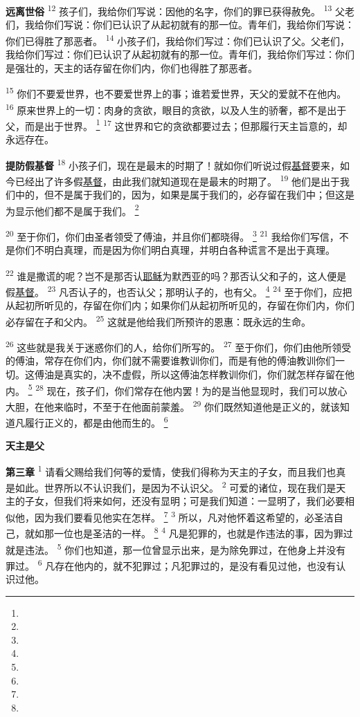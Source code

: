 \begin{multicols}{2}
\textbf{远离世俗\quad}
\textsuperscript{12}
孩子们，我给你们写说：因他的名字，你们的罪已获得赦免。
\textsuperscript{13}
父老们，我给你们写说：你们已认识了从起初就有的那一位。青年们，我给你们写说：你们已得胜了那恶者。
\textsuperscript{14}
小孩子们，我给你们写过：你们已认识了父。父老们，我给你们写过：你们已认识了从起初就有的那一位。青年们，我给你们写过：你们是强壮的，天主的话存留在你们内，你们也得胜了那恶者。

\textsuperscript{15}
你们不要爱世界，也不要爱世界上的事；谁若爱世界，天父的爱就不在他内。
\textsuperscript{16}
原来世界上的一切：肉身的贪欲，眼目的贪欲，以及人生的骄奢，都不是出于父，而是出于世界。
\footnote{}
\textsuperscript{17}
这世界和它的贪欲都要过去；但那履行天主旨意的，却永远存在。

\textbf{提防假基督\quad}
\textsuperscript{18}
小孩子们，现在是最末的时期了！就如你们听说过假\uline{基督}要来，如今已经出了许多假\uline{基督}，由此我们就知道现在是最末的时期了。
\textsuperscript{19}
他们是出于我们中的，但不是属于我们的，因为，如果是属于我们的，必存留在我们中；但这是为显示他们都不是属于我们。
\footnote{}

\textsuperscript{20}
至于你们，你们由圣者领受了傅油，并且你们都晓得。
\footnote{}
\textsuperscript{21}
我给你们写信，不是你们不明白真理，而是因为你们明白真理，并明白各种谎言不是出于真理。

\textsuperscript{22}
谁是撒谎的呢？岂不是那否认\uline{耶稣}为默西亚的吗？那否认父和子的，这人便是假\uline{基督}。
\textsuperscript{23}
凡否认子的，也否认父；那明认子的，也有父。
\footnote{}
\textsuperscript{24}
至于你们，应把从起初所听见的，存留在你们内；如果你们从起初所听见的，存留在你们内，你们必存留在子和父内。
\textsuperscript{25}
这就是他给我们所预许的恩惠：既永远的生命。

\textsuperscript{26}
这些就是我关于迷惑你们的人，给你们所写的。
\textsuperscript{27}
至于你们，你们由他所领受的傅油，常存在你们内，你们就不需要谁教训你们，而是有他的傅油教训你们一切。这傅油是真实的，决不虚假，所以这傅油怎样教训你们，你们就怎样存留在他内。
\footnote{}
\textsuperscript{28}
现在，孩子们，你们常存在他内罢！为的是当他显现时，我们可以放心大胆，在他来临时，不至于在他面前蒙羞。
\textsuperscript{29}
你们既然知道他是正义的，就该知道凡履行正义的，都是由他而生的。
\footnote{}

\begin{center}
	\textbf{\large{\songti 天主是父}}
\end{center}

\textbf{第三章\quad}
\textsuperscript{1}
请看父赐给我们何等的爱情，使我们得称为天主的子女，而且我们也真是如此。世界所以不认识我们，是因为不认识父。
\textsuperscript{2}
可爱的诸位，现在我们是天主的子女，但我们将来如何，还没有显明；可是我们知道：一显明了，我们必要相似他，因为我们要看见他实在怎样。
\footnote{}
\textsuperscript{3}
所以，凡对他怀着这希望的，必圣洁自己，就如那一位也是圣洁的一样。
\footnote{}
\textsuperscript{4}
凡是犯罪的，也就是作违法的事，因为罪过就是违法。
\textsuperscript{5}
你们也知道，那一位曾显示出来，是为除免罪过，在他身上并没有罪过。
\textsuperscript{6}
凡存在他内的，就不犯罪过；凡犯罪过的，是没有看见过他，也没有认识过他。


\end{multicols}
